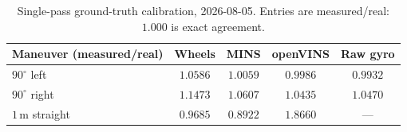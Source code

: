 \begin{table}[htbp]
\centering\small
\begin{tabular}{lcccc}
\toprule
Maneuver (measured/real) & Wheels & MINS & openVINS & Raw gyro \\
\midrule
$90^\circ$ left  & $1.0586$ & $1.0059$ & $0.9986$ & $0.9932$ \\
$90^\circ$ right & $1.1473$ & $1.0607$ & $1.0435$ & $1.0470$ \\
$1$\,m straight  & $0.9685$ & $0.8922$ & $1.8660$ & --- \\
\bottomrule
\end{tabular}
\caption{Single-pass ground-truth calibration, 2026-08-05. Entries are
measured/real: $1.000$ is exact agreement.}
\label{tab:aug05calib}
\end{table}

